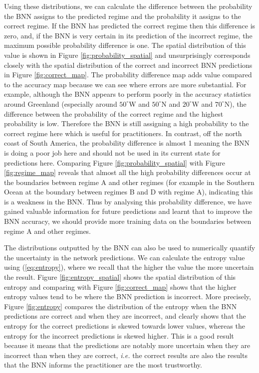 \documentclass[a4paper]{article}
\begin{document}
Using these distributions, we can calculate the difference between the probability the BNN assigns to the predicted regime and the probability it assigns to the correct regime. If the BNN has predicted the correct regime then this difference is zero, and, if the BNN is very certain in its prediction of the incorrect regime, the maximum possible probability difference is one. The spatial distribution of this value is shown in Figure \ref{fig:probability_spatial} and unsurprisingly corresponds closely with the spatial distribution of the correct and incorrect BNN predictions in Figure \ref{fig:correct_map}. The probability difference map adds value compared to the accuracy map because we can see where errors are more substantial. For example, although the BNN appears to perform poorly in the accuracy statistics around Greenland (especially around $50^{\circ}$W and $50^{\circ}$N and $20^{\circ}$W and $70^{\circ}$N), the difference between the probability of the correct regime and the highest probability is low. Therefore the BNN is still assigning a high probability to the correct regime here which is useful for practitioners. In contrast, off the north coast of South America, the probability difference is almost 1 meaning the BNN is doing a poor job here and should not be used in its current state for predictions here. Comparing Figure \ref{fig:probability_spatial} with Figure \ref{fig:regime_map} reveals that almost all the high probability differences occur at the boundaries between regime A and other regimes (for example in the Southern Ocean at the boundary between regimes B and D with regime A), indicating this is a weakness in the BNN. Thus by analysing this probability difference, we have gained valuable information for future predictions and learnt that to improve the BNN accuracy, we should provide more training data on the boundaries between regime A and other regimes.

The distributions outputted by the BNN can also be used to numerically quantify the uncertainty in the network predictions. We can calculate the entropy value using (\ref{eq:entropy}), where we recall that the higher the value the more uncertain the result. Figure \ref{fig:entropy_spatial} shows the spatial distribution of this entropy and comparing with Figure \ref{fig:correct_map} shows that the higher entropy values tend to be where the BNN prediction is incorrect. More precisely, Figure \ref{fig:entropy} compares the distribution of the entropy when the BNN predictions are correct and when they are incorrect, and clearly shows that the entropy for the correct predictions is skewed towards lower values, whereas the entropy for the incorrect predictions is skewed higher. This is a good result because it means that the predictions are notably more uncertain when they are incorrect than when they are correct, \textit{i.e.} the correct results are also the results that the BNN informs the practitioner are the most trustworthy.
\end{document}
